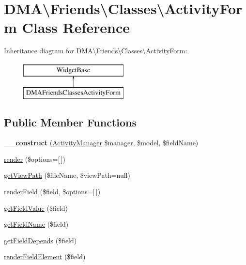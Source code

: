 \hypertarget{classDMA_1_1Friends_1_1Classes_1_1ActivityForm}{}\section{D\+M\+A\textbackslash{}Friends\textbackslash{}Classes\textbackslash{}Activity\+Form Class Reference}
\label{classDMA_1_1Friends_1_1Classes_1_1ActivityForm}
Inheritance diagram for D\+M\+A\textbackslash{}Friends\textbackslash{}Classes\textbackslash{}Activity\+Form\+:\begin{figure}[H]
\begin{center}
\leavevmode
\includegraphics[height=2.000000cm]{d7/d10/classDMA_1_1Friends_1_1Classes_1_1ActivityForm}
\end{center}
\end{figure}
\subsection*{Public Member Functions}
\begin{DoxyCompactItemize}
\item 
\hypertarget{classDMA_1_1Friends_1_1Classes_1_1ActivityForm_afcb45ea0cd733979ad0429595a497223}{}{\bfseries \+\_\+\+\_\+construct} (\hyperlink{classDMA_1_1Friends_1_1Classes_1_1ActivityManager}{Activity\+Manager} \$manager, \$model, \$field\+Name)\label{classDMA_1_1Friends_1_1Classes_1_1ActivityForm_afcb45ea0cd733979ad0429595a497223}

\item 
\hyperlink{classDMA_1_1Friends_1_1Classes_1_1ActivityForm_a63f9588fb768954aa6e792841ef7a798}{render} (\$options=\mbox{[}$\,$\mbox{]})
\item 
\hyperlink{classDMA_1_1Friends_1_1Classes_1_1ActivityForm_a67f1c67ad0885f8ade7cc055db01d36a}{get\+View\+Path} (\$file\+Name, \$view\+Path=null)
\item 
\hyperlink{classDMA_1_1Friends_1_1Classes_1_1ActivityForm_a903a1043ee05a6f169d5aea07ef0bb79}{render\+Field} (\$field, \$options=\mbox{[}$\,$\mbox{]})
\item 
\hyperlink{classDMA_1_1Friends_1_1Classes_1_1ActivityForm_ab7d19395c670391b052793e77fd364f2}{get\+Field\+Value} (\$field)
\item 
\hyperlink{classDMA_1_1Friends_1_1Classes_1_1ActivityForm_a105d514226be33dec93db56dbfe61ff1}{get\+Field\+Name} (\$field)
\item 
\hyperlink{classDMA_1_1Friends_1_1Classes_1_1ActivityForm_ae7e6de46fdaa48ef75743de550e0c87b}{get\+Field\+Depends} (\$field)
\item 
\hyperlink{classDMA_1_1Friends_1_1Classes_1_1ActivityForm_a5a5fbcb361a17abaa69b260df1a4a94b}{render\+Field\+Element} (\$field)
\end{DoxyCompactItemize}

